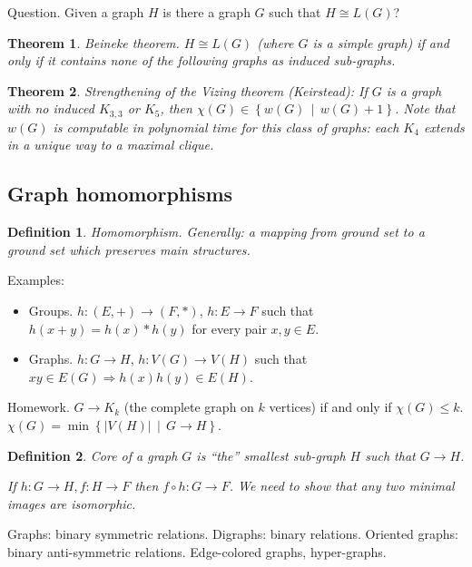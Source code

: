 \documentclass[12pt,a4paper]{article} \usepackage{fontspec}
\newtheorem{theorem}{Theorem} \newtheorem{definition}{Definition}
\begin{document}
Question. Given a graph \(H\) is there a graph \(G\) such that \(H \cong L(G)\)?

\begin{theorem} Beineke theorem.  \(H \cong L(G)\) (where \(G\) is a simple
graph) if and only if it contains none of the following graphs as induced
sub-graphs.  \end{theorem}

\begin{theorem} Strengthening of the Vizing theorem (Keirstead): If \(G\) is a
graph with no induced \(K_{3,3}\) or \(K_5\), then \(\chi(G) \in \left\{w(G)
\,\middle|\, w(G) + 1\right\}\).  Note that \(w(G)\) is computable in polynomial
time for this class of graphs: each \(K_4\) extends in a unique way to a maximal
clique.  \end{theorem}

\subsection{Graph homomorphisms}

\begin{definition} Homomorphism.  Generally: a mapping from ground set to a
ground set which preserves main structures.  \end{definition}

Examples: \begin{itemize} \item Groups. \(h: (E, +) \to (F, *)\), \(h: E \to F\)
such that \(h(x + y) = h(x) * h(y)\) for every pair \(x, y \in E\).  \item
Graphs. \(h: G \to H\), \(h: V(G) \to V(H)\) such that \(xy \in E(G) \Rightarrow
h(x)h(y) \in E(H)\).  \end{itemize}

Homework. \(G \to K_k\) (the complete graph on \(k\) vertices) if and only if
\(\chi(G) \leq k\).  \(\chi(G) = \min\left\{|V(H)| \,\middle|\, G \to
H\right\}\).

\begin{definition} Core of a graph \(G\) is \enquote{the} smallest sub-graph
\(H\) such that \(G \to H\).

  If \(h: G \to H, f: H \to F\) then \(f \circ h: G \to F\).  We need to show
that any two minimal images are isomorphic.  \end{definition}

Graphs: binary symmetric relations.  Digraphs: binary relations.  Oriented
graphs: binary anti-symmetric relations.  Edge-colored graphs, hyper-graphs.
\end{document}
